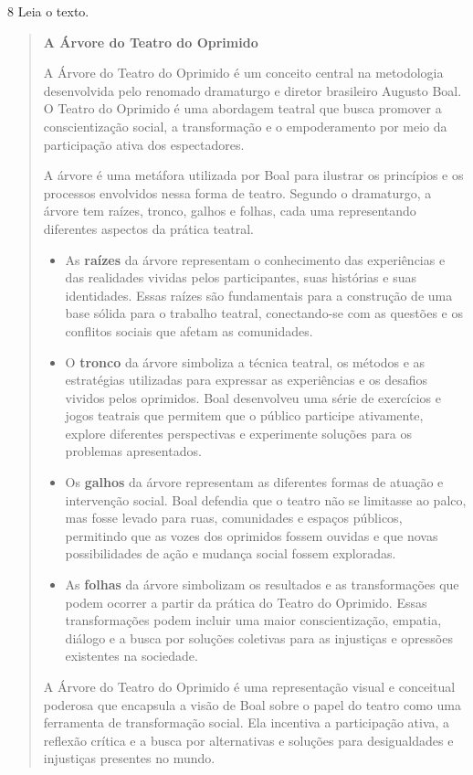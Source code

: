 \num{8} Leia o texto.

\begin{quote}
\textbf{A Árvore do Teatro do Oprimido}

A Árvore do Teatro do Oprimido é um conceito central na metodologia desenvolvida pelo renomado dramaturgo e 
diretor brasileiro Augusto Boal. O Teatro do Oprimido é uma abordagem teatral que busca promover a 
conscientização social, a transformação e o empoderamento por meio da participação ativa dos espectadores.

A árvore é uma metáfora utilizada por Boal para ilustrar os princípios e os processos envolvidos nessa 
forma de teatro. Segundo o dramaturgo, a árvore tem raízes, tronco, galhos e folhas, cada uma representando diferentes aspectos da prática teatral.

\begin{itemize}
  \item As \textbf{raízes} da árvore representam o conhecimento das experiências e das realidades vividas 
  pelos participantes, suas histórias e suas identidades. Essas raízes são fundamentais para a construção 
  de uma base sólida para o trabalho teatral, conectando-se com as questões e os conflitos sociais que 
  afetam as comunidades.
  \item O \textbf{tronco} da árvore simboliza a técnica teatral, os métodos e as estratégias utilizadas 
  para expressar as experiências e os desafios vividos pelos oprimidos. Boal desenvolveu uma série de 
  exercícios e jogos teatrais que permitem que o público participe ativamente, explore diferentes 
  perspectivas e experimente soluções para os problemas apresentados.
  \item Os \textbf{galhos} da árvore representam as diferentes formas de atuação e intervenção social. Boal 
  defendia que o teatro não se limitasse ao palco, mas fosse levado para ruas, comunidades e espaços 
  públicos, permitindo que as vozes dos oprimidos fossem ouvidas e que novas possibilidades de ação e 
  mudança social fossem exploradas.
  \item As \textbf{folhas} da árvore simbolizam os resultados e as transformações que podem ocorrer a 
  partir da prática do Teatro do Oprimido. Essas transformações podem incluir uma maior conscientização, 
  empatia, diálogo e a busca por soluções coletivas para as injustiças e opressões existentes na sociedade.
\end{itemize}

A Árvore do Teatro do Oprimido é uma representação visual e conceitual poderosa que encapsula a visão de 
Boal sobre o papel do teatro como uma ferramenta de transformação social. Ela incentiva a participação 
ativa, a reflexão crítica e a busca por alternativas e soluções para desigualdades e injustiças presentes 
no mundo.

\end{quote}

